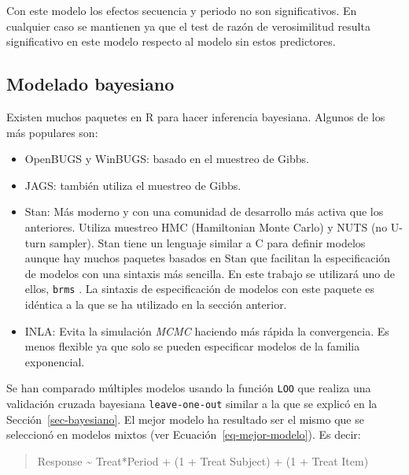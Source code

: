 \documentclass[
  12pt,
  a4paper,
  extrafontsizes,
  onecolumn,
  openright,
  table]{memoir}
\providecommand{\tightlist}{%
  \setlength{\itemsep}{0pt}\setlength{\parskip}{0pt}}\usepackage{longtable,booktabs,array}
\begin{document}
\normalsize

Con este modelo los efectos secuencia y periodo no son significativos.
En cualquier caso se mantienen ya que el test de razón de verosimilitud
resulta significativo en este modelo respecto al modelo sin estos
predictores.

\hypertarget{sec-bayesiano-2}{%
\subsection{Modelado bayesiano}\label{sec-bayesiano-2}}

Existen muchos paquetes en R para hacer inferencia bayesiana. Algunos de
los más populares son:

\begin{itemize}
\tightlist
\item
  OpenBUGS y WinBUGS: basado en el muestreo de Gibbs.
\item
  JAGS: también utiliza el muestreo de Gibbs.
\item
  Stan: Más moderno y con una comunidad de desarrollo más activa que los
  anteriores. Utiliza muestreo HMC (Hamiltonian Monte Carlo) y NUTS (no
  U-turn sampler). Stan tiene un lenguaje similar a C para definir
  modelos aunque hay muchos paquetes basados en Stan que facilitan la
  especificación de modelos con una sintaxis más sencilla. En este
  trabajo se utilizará uno de ellos, \texttt{brms}
  \autocite[ver][]{brms} . La sintaxis de especificación de modelos con
  este paquete es idéntica a la que se ha utilizado en la sección
  anterior.
\item
  INLA: Evita la simulación \emph{\gls{MCMC}} haciendo más rápida la
  convergencia. Es menos flexible ya que solo se pueden especificar
  modelos de la familia exponencial.
\end{itemize}

Se han comparado múltiples modelos usando la función \texttt{LOO} que
realiza una validación cruzada bayesiana \texttt{leave-one-out} similar
a la que se explicó en la Sección~\ref{sec-bayesiano}. El mejor modelo
ha resultado ser el mismo que se seleccionó en modelos mixtos (ver
Ecuación~\ref{eq-mejor-modelo}). Es decir:

\small

\begin{quote}
Response \textasciitilde{} Treat*Period + (1 + Treat \textbar{} Subject)
+ (1 + Treat \textbar{} Item) \normalsize
\end{quote}

\scriptsize
\end{document}
